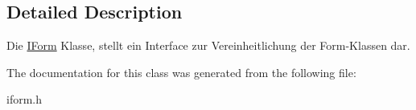 \subsection{Detailed Description}
Die \hyperlink{class_i_form}{I\+Form} Klasse, stellt ein Interface zur Vereinheitlichung der Form-\/\+Klassen dar. 

The documentation for this class was generated from the following file\+:\begin{DoxyCompactItemize}
\item 
iform.\+h\end{DoxyCompactItemize}
